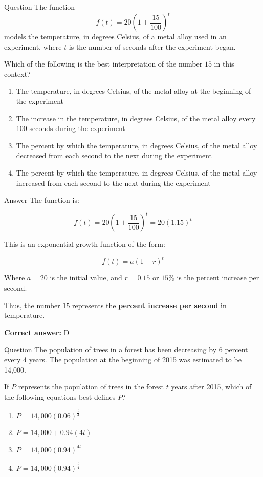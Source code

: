 \documentclass{beamer}
\begin{document}
\begin{frame}{Question}
\small
The function 
\[
f(t) = 20\left(1 + \frac{15}{100} \right)^t
\]
models the temperature, in degrees Celsius, of a metal alloy used in an experiment, where $t$ is the number of seconds after the experiment began. 

Which of the following is the best interpretation of the number $15$ in this context?

\begin{enumerate}
  \item[A)] The temperature, in degrees Celsius, of the metal alloy at the beginning of the experiment
  \item[B)] The increase in the temperature, in degrees Celsius, of the metal alloy every 100 seconds during the experiment
  \item[C)] The percent by which the temperature, in degrees Celsius, of the metal alloy decreased from each second to the next during the experiment
  \item[D)] The percent by which the temperature, in degrees Celsius, of the metal alloy increased from each second to the next during the experiment
\end{enumerate}
\end{frame}
\begin{frame}{Answer}
The function is:

\[
f(t) = 20\left(1 + \frac{15}{100} \right)^t = 20(1.15)^t
\]

This is an exponential growth function of the form:

\[
f(t) = a(1 + r)^t
\]

Where $a = 20$ is the initial value, and $r = 0.15$ or $15\%$ is the percent increase per second.

Thus, the number $15$ represents the \textbf{percent increase per second} in temperature.

\textbf{Correct answer:} D
\end{frame}


\begin{frame}{Question}
The population of trees in a forest has been decreasing by 6 percent every 4 years. The population at the beginning of 2015 was estimated to be 14,000. 

If $P$ represents the population of trees in the forest $t$ years after 2015, which of the following equations best defines $P$?

\begin{enumerate}
  \item[A)] $P = 14{,}000(0.06)^{\frac{t}{4}}$
  \item[B)] $P = 14{,}000 + 0.94(4t)$
  \item[C)] $P = 14{,}000(0.94)^{4t}$
  \item[D)] $P = 14{,}000(0.94)^{\frac{t}{4}}$
\end{enumerate}
\end{frame}
\end{document}
